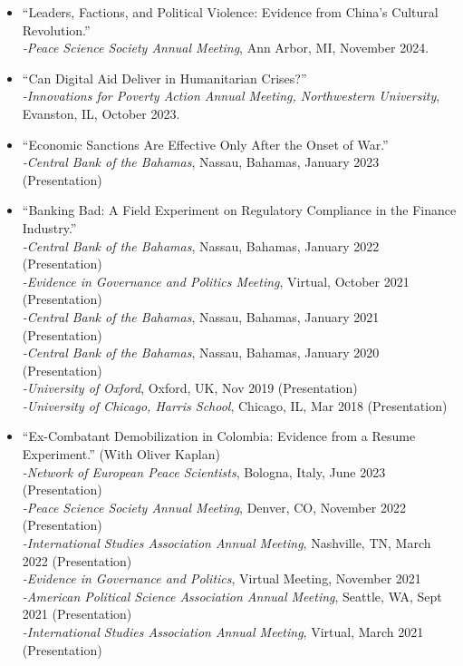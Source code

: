 \documentclass[10pt]{article}
\begin{document}
\begin{itemize}

\item ``Leaders, Factions, and Political Violence: Evidence from China's Cultural Revolution.'' 
\\ \indent \textit{-Peace Science Society Annual Meeting}, Ann Arbor, MI, November 2024.

\item ``Can Digital Aid Deliver in Humanitarian Crises?'' 
\\ \indent \textit{-Innovations for Poverty Action Annual Meeting, Northwestern University}, Evanston, IL, October 2023.

\item ``Economic Sanctions Are Effective Only After the Onset of War.''
\\ \indent \textit{-Central Bank of the Bahamas}, Nassau, Bahamas, January 2023 (Presentation)

\item ``Banking Bad: A Field Experiment on Regulatory Compliance in the Finance Industry.'' 
\\ \indent \textit{-Central Bank of the Bahamas}, Nassau, Bahamas, January 2022 (Presentation)
\\ \indent \textit{-Evidence in Governance and Politics Meeting}, Virtual, October 2021 (Presentation)
\\ \indent \textit{-Central Bank of the Bahamas}, Nassau, Bahamas, January 2021 (Presentation)
\\ \indent \textit{-Central Bank of the Bahamas}, Nassau, Bahamas, January 2020 (Presentation)
\\ \indent \textit{-University of Oxford}, Oxford, UK, Nov 2019 (Presentation)
\\ \indent \textit{-University of Chicago, Harris School}, Chicago, IL, Mar 2018 (Presentation)

\item ``Ex-Combatant Demobilization in Colombia: Evidence from a Resume Experiment.'' (With Oliver Kaplan)
\\ \indent \textit{-Network of European Peace Scientists}, Bologna, Italy, June 2023 (Presentation)
\\ \indent \textit{-Peace Science Society Annual Meeting}, Denver, CO, November 2022 (Presentation)
\\ \indent \textit{-International Studies Association Annual Meeting}, Nashville, TN, March 2022 (Presentation)
\\ \indent \textit{-Evidence in Governance and Politics}, Virtual Meeting, November 2021
\\ \indent \textit{-American Political Science Association Annual Meeting}, Seattle, WA, Sept 2021 (Presentation)
\\ \indent \textit{-International Studies Association Annual Meeting}, Virtual, March 2021 (Presentation)


\end{itemize}
\end{document}
